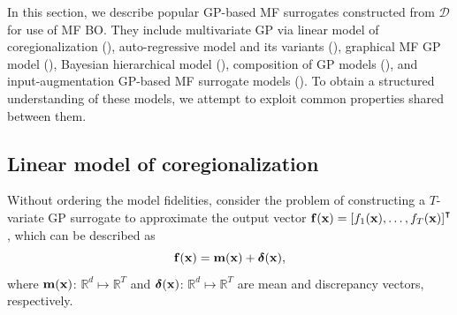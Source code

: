 \documentclass[journal ]{new-aiaa}
\begin{document}
In this section, we describe popular GP-based MF surrogates constructed from $\mathcal{D}$ for use of MF BO.
They include multivariate GP via linear model of coregionalization (), auto-regressive model and its variants (), graphical MF GP model (), Bayesian hierarchical model (), composition of GP models (), and input-augmentation GP-based MF surrogate models ().
To obtain a structured understanding of these models, we attempt to exploit common properties shared between them.

\subsection{Linear model of coregionalization}\label{Sec41}

Without ordering the model fidelities, consider the problem of constructing a $T$-variate GP surrogate to approximate the output vector ${\bf f}({\bf x})=\left[f_1({\bf x}),\dots,f_T({\bf x})\right]^\intercal$, which can be described as
\begin{equation}\label{eqn4}
	{\bf f}({\bf x}) = {\bf m}({\bf x}) + {\boldsymbol \delta}({\bf x}),
\end{equation}
where ${\bf m}({\bf x})$: $\mathbb{R}^d \mapsto \mathbb{R}^T$  and ${\boldsymbol \delta}({\bf x})$: $\mathbb{R}^d \mapsto \mathbb{R}^T$ are mean and discrepancy vectors, respectively.
\end{document}
